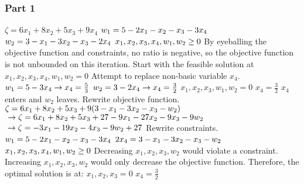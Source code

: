 \documentclass{article}
\begin{document}
\subsubsection*{Part 1}
$\zeta = 6x_1 + 8x_2 + 5x_3 + 9x_4$
$\\ w_1 = 5 - 2x_1 - x_2 - x_3 - 3x_4$
$\\ w_2 = 3 - x_1 - 3x_2 - x_3 - 2x_4$
$\\ x_1, x_2, x_3, x_4, w_1, w_2 \geq 0$
\newline By eyeballing the objective function and constraints, no ratio is negative, so the objective function is not unbounded on this iteration.
\newline Start with the feasible solution at $x_1, x_2, x_3, x_4, w_1, w_2 = 0$
\newline Attempt to replace non-basic variable $x_4$.
$\\ w_1 = 5 - 3x_4 \to x_4 = \frac{5}{3}$
$\\ w_2 = 3 - 2x_4 \to x_4 = \frac{3}{2}$
\newline $x_1, x_2, x_3, w_1, w_2 = 0$
\newline $x_4 = \frac{3}{2}$
\newline $x_4$ enters and $w_2$ leaves.
\newline Rewrite objective function.
$\\\zeta = 6x_1 + 8x_2 + 5x_3 + 9(3 - x_1 - 3x_2 - x_3 - w_2)$
$\\\to \zeta = 6x_1 + 8x_2 + 5x_3 + 27 - 9x_1 - 27x_2 - 9x_3 - 9w_2$
$\\\to \zeta = - 3x_1 - 19x_2 - 4x_3 - 9w_2 + 27$
\newline Rewrite constraints.
$\\ w_1 = 5 - 2x_1 - x_2 - x_3 - 3x_4$
$\\ 2x_4 = 3 - x_1 - 3x_2 - x_3 - w_2$
$\\ x_1, x_2, x_3, x_4, w_1, w_2 \geq 0$
\newline Decreasing $x_1, x_2, x_3, w_2$ would violate a constraint. Increasing $x_1, x_2, x_3, w_2$ would only decrease the objective function. Therefore, the optimal solution is at:
\newline $x_1, x_2, x_3 = 0$
\newline $x_4 = \frac{3}{2}$
\end{document}
